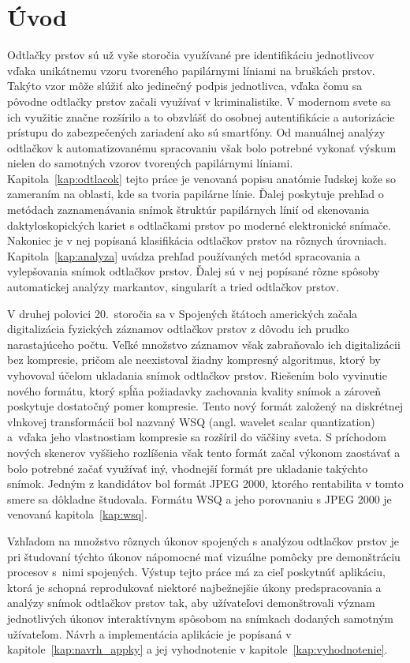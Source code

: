 \chapter{Úvod}
  Odtlačky prstov sú už vyše storočia využívané pre identifikáciu jednotlivcov vďaka unikátnemu vzoru tvoreného papilárnymi líniami na bruškách prstov.
  Takýto vzor môže slúžiť ako jedinečný podpis jednotlivca, vďaka čomu sa pôvodne odtlačky prstov začali využívať v kriminalistike. V modernom svete sa ich
  využitie značne rozšírilo a to obzvlášť do osobnej autentifikácie a autorizácie prístupu do zabezpečených zariadení ako sú smartfóny. Od manuálnej analýzy
  odtlačkov k automatizovanému spracovaniu však bolo potrebné vykonať výskum nielen do samotných vzorov tvorených papilárnymi líniami.
  Kapitola~{\ref{kap:odtlacok}} tejto práce je venovaná popisu anatómie ľudskej
  kože so zameraním na oblasti, kde sa tvoria papilárne línie. Ďalej poskytuje prehľad o metódach zaznamenávania snímok štruktúr papilárnych línií od
  skenovania daktyloskopických kariet s odtlačkami prstov po moderné elektronické snímače. Nakoniec je v nej popísaná klasifikácia odtlačkov prstov na rôznych
  úrovniach. Kapitola~{\ref{kap:analyza}} uvádza prehľad používaných metód spracovania a vylepšovania snímok odtlačkov prstov. Ďalej sú v nej popísané rôzne
  spôsoby automatickej analýzy markantov, singularít a tried odtlačkov prstov.

  V druhej polovici 20.~storočia sa v Spojených štátoch amerických začala digitalizácia fyzických záznamov odtlačkov prstov z dôvodu ich prudko narastajúceho
  počtu. Veľké množstvo záznamov však zabraňovalo ich digitalizácii bez kompresie, pričom ale neexistoval žiadny kompresný algoritmus, ktorý by vyhovoval
  účelom ukladania snímok odtlačkov prstov. Riešením bolo vyvinutie nového formátu, ktorý spĺňa požiadavky zachovania kvality snímok a zároveň poskytuje
  dostatočný pomer kompresie. Tento nový formát založený na diskrétnej vlnkovej transformácii bol nazvaný WSQ (angl. wavelet scalar quantization) a~vďaka
  jeho vlastnostiam kompresie sa rozšíril do väčšiny sveta. S príchodom nových skenerov vyššieho rozlíšenia však tento formát začal výkonom zaostávať a
  bolo potrebné začať využívať iný, vhodnejší formát pre ukladanie takýchto snímok. Jedným z kandidátov bol formát JPEG 2000, ktorého rentabilita v tomto smere
  sa dôkladne študovala. Formátu WSQ a jeho porovnaniu s JPEG 2000 je venovaná kapitola~{\ref{kap:wsq}}.

  Vzhľadom na množstvo rôznych úkonov spojených s analýzou odtlačkov prstov je pri študovaní týchto úkonov nápomocné mať vizuálne pomôcky
  pre demonštráciu procesov s~nimi spojených. Výstup tejto práce má za cieľ poskytnúť aplikáciu, ktorá je schopná reprodukovať
  niektoré najbežnejšie úkony predspracovania a analýzy snímok odtlačkov prstov tak, aby užívateľovi demonštrovali význam jednotlivých úkonov
  interaktívnym spôsobom na snímkach dodaných samotným užívateľom. Návrh a implementácia aplikácie je popísaná v kapitole~{\ref{kap:navrh_appky}}
  a jej vyhodnotenie v kapitole~{\ref{kap:vyhodnotenie}}.

